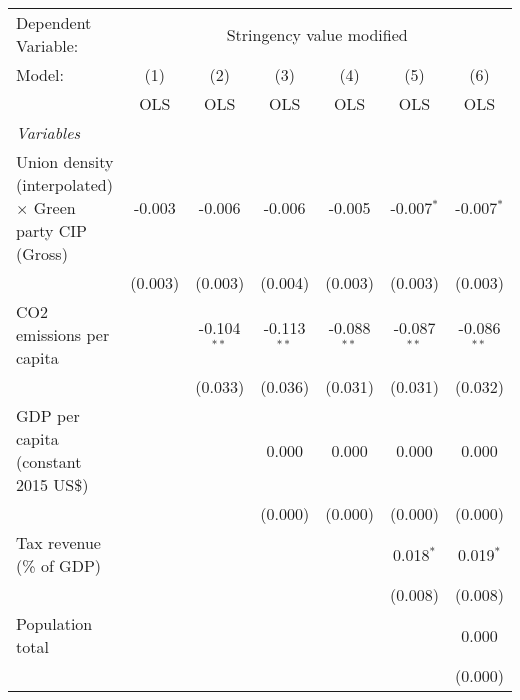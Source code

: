 
\begingroup
\centering
\begin{tabular}{lcccccc}
   \toprule
   Dependent Variable: & \multicolumn{6}{c}{Stringency value modified}\\
   Model:                                                         & (1)     & (2)           & (3)           & (4)           & (5)           & (6)\\  
                                                                  &  OLS    & OLS           & OLS           & OLS           & OLS           & OLS\\  
   \midrule
   \emph{Variables}\\
   Union density (interpolated) $\times$ Green party CIP (Gross)  & -0.003  & -0.006        & -0.006        & -0.005        & -0.007$^{*}$  & -0.007$^{*}$\\   
                                                                  & (0.003) & (0.003)       & (0.004)       & (0.003)       & (0.003)       & (0.003)\\   
   CO2 emissions per capita                                       &         & -0.104$^{**}$ & -0.113$^{**}$ & -0.088$^{**}$ & -0.087$^{**}$ & -0.086$^{**}$\\   
                                                                  &         & (0.033)       & (0.036)       & (0.031)       & (0.031)       & (0.032)\\   
   GDP per capita (constant 2015 US\$)                            &         &               & 0.000         & 0.000         & 0.000         & 0.000\\   
                                                                  &         &               & (0.000)       & (0.000)       & (0.000)       & (0.000)\\   
   Tax revenue (\% of GDP)                                        &         &               &               &               & 0.018$^{*}$   & 0.019$^{*}$\\   
                                                                  &         &               &               &               & (0.008)       & (0.008)\\   
   Population total                                               &         &               &               &               &               & 0.000\\   
                                                                  &         &               &               &               &               & (0.000)\\   

\end{tabular}
